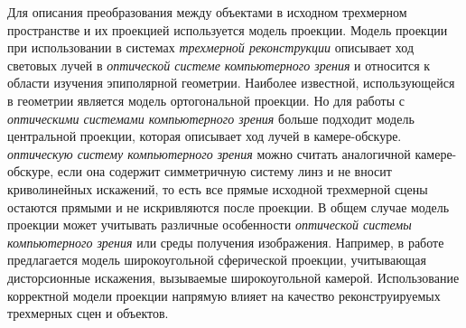 \begin{SCn}
\end{SCn}

\begin{SCn}
\end{SCn}

\begin{SCn}
\end{SCn}

Для описания преобразования между объектами в исходном трехмерном пространстве и их проекцией используется модель проекции. Модель проекции при использовании в системах \textit{трехмерной реконструкции} описывает ход световых лучей в \textit{оптической системе компьютерного зрения} и относится к области изучения эпиполярной геометрии. Наиболее известной, использующейся в геометрии является модель ортогональной проекции. Но для работы с \textit{оптическими системами компьютерного зрения} больше подходит модель центральной проекции, которая описывает ход лучей в камере-обскуре. \textit{оптическую систему компьютерного зрения} можно считать аналогичной камере-обскуре, если она содержит симметричную систему линз и не вносит криволинейных искажений, то есть все прямые исходной трехмерной сцены остаются прямыми и не искривляются после проекции. В общем случае модель проекции может учитывать различные особенности \textit{оптической системы компьютерного зрения} или среды получения изображения. Например, в работе  предлагается модель широкоугольной сферической проекции, учитывающая дисторсионные искажения, вызываемые широкоугольной камерой. Использование корректной модели проекции напрямую влияет на качество реконструируемых трехмерных сцен и объектов.

\begin{SCn}
\end{SCn}

